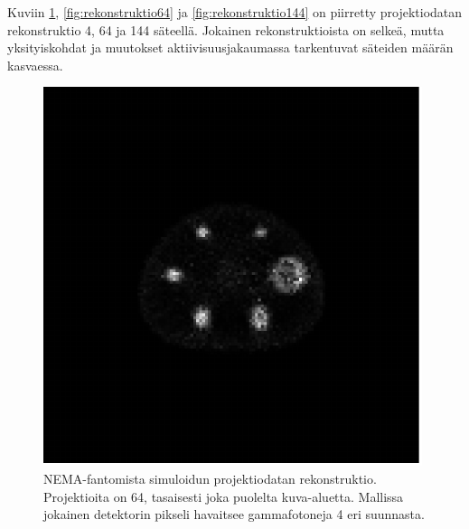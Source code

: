 \iffalse
Kuviin \ref{fig:rekonstruktio4}, \ref{fig:rekonstruktio64} ja \ref{fig:rekonstruktio144} on piirretty projektiodatan rekonstruktio 4, 64 ja 144 säteellä. Jokainen rekonstruktioista on selkeä, mutta yksityiskohdat ja muutokset aktiivisuusjakaumassa tarkentuvat säteiden määrän kasvaessa.
\begin{figure}[H]
    \centering
    \captionsetup{width=.9\linewidth}
    \includegraphics[width=.9\linewidth]{kuvat/rekonstruktio_nRay4.pdf}
    \caption{NEMA-fantomista simuloidun projektiodatan rekonstruktio. Projektioita on 64, tasaisesti joka puolelta kuva-aluetta. Mallissa jokainen detektorin pikseli havaitsee gammafotoneja 4 eri suunnasta.}
    \label{fig:rekonstruktio4}
\end{figure}
